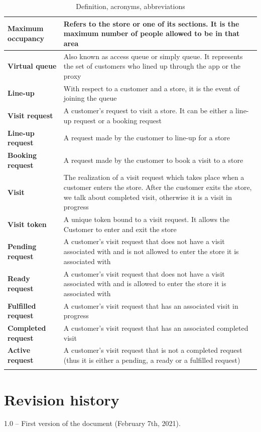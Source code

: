 \documentclass[a4paper,oneside,11pt]{book}
\begin{document}
\begin{longtable}[c] { |>{\bfseries{}}C{0.25\textwidth}|H{0.55\textwidth}| }
        Maximum occupancy & Refers to the store or one of its sections. It is the maximum number of people allowed to be in that area \\ \hline
        Virtual queue & Also known as access queue or simply queue. It represents the set of customers who lined up through the app or the proxy \\ \hline
        Line-up & With respect to a customer and a store, it is the event of joining the queue \\ \hline
        Visit request & A customer’s request to visit a store. It can be either a line-up request or a booking request \\ \hline
        Line-up request & A request made by the customer to line-up for a store \\ \hline
        Booking request & A request made by the customer to book a visit to a store \\ \hline
        Visit & The realization of a visit request which takes place when a customer enters the store. After the customer exits the store, we talk about completed visit, otherwise it is a visit in progress  \\ \hline
        Visit token & A unique token bound to a visit request. It allows the Customer to enter and exit the store \\ \hline
        Pending request & A customer’s visit request that does not have a visit associated with and is not allowed to enter the store it is associated with \\ \hline
        Ready request & A customer’s visit request that does not have a visit associated with and is allowed to enter the store it is associated with \\ \hline
        Fulfilled request & A customer’s visit request that has an associated visit in progress \\ \hline
        Completed request & A customer’s visit request that has an associated completed visit \\ \hline
        Active request & A customer’s visit request that is not a completed request (thus it is either a pending, a ready or a fulfilled request) \\
        \hline
    \caption{Definition, acronyms, abbreviations}
    \label{table:definitions_acronyms_abbreviations}
    \end{longtable}

    \section{Revision history}
    1.0 -- First version of the document (February 7th, 2021).
    
\end{document}
